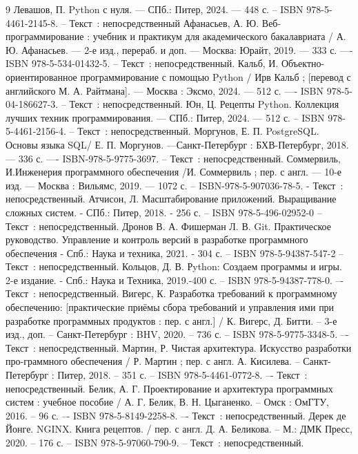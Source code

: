 \begin{thebibliography}{9}
     Левашов, П. Python с нуля. — СПб.: Питер, 2024. — 448 с. -- ISBN 978-5-4461-2145-8. -- Текст~: непосредственный
     Афанасьев, А. Ю. Веб-программирование : учебник и практикум для академического бакалавриата / А. Ю. Афанасьев. — 2-е изд., перераб. и доп. — Москва: Юрайт, 2019. — 333 с. —- ISBN 978-5-534-01432-5. -- Текст~: непосредственный.
     Кальб, И. Объектно-ориентированное программирование с помощью Python / Ирв Кальб ; [перевод с английского М. А. Райтмана]. — Москва : Эксмо, 2024. — 512 с. —- ISBN 978-5-04-186627-3. -- Текст~: непосредственный.
     Юн,	Ц. Рецепты Python. Коллекция лучших техник программирования. — СПб.: Питер, 2024. — 512 с. -- ISBN 978-5-4461-2156-4. -- Текст~: непосредственный.
     Моргунов, Е. П. PostgreSQL. Основы языка SQL/ Е. П. Моргунов. —Санкт-Петербург : БХВ-Петербург, 2018. — 336 с. —- ISBN-978-5-9775-3697. -- Текст~: непосредственный.
     Соммервиль, И.Инженерия программного обеспечения /И. Соммервиль ; пер. с англ. — 10-е изд. — Москва : Вильямс, 2019. — 1072 с. -- ISBN-978-5-907036-78-5. - Текст~: непосредственный.
     Атчисон, Л. Масштабирование приложений. Выращивание сложных систем. - СПб.: Питер, 2018. - 256 с. -- ISBN 978-5-496-02952-0 -- Текст~: непосредственный.
     Дронов В. А. Фишерман Л. В. Git. Практическое руководство. Управление и контроль версий в разработке программного обеспечения - Спб.: Наука и техника, 2021. - 304 с. -- ISBN 978-5-94387-547-2 -- Текст~: непосредственный.
     Кольцов, Д. В. Рython: Создаем программы и игры. 2-е издание. - Спб.: Наука и Техника, 2019.-400 с. -- ISBN 978-5-94387-778-0. –- Текст~: непосредственный. 
     Вигерс, К. Разработка требований к программному обеспечению: [практические приёмы сбора требований и управления ими при разработке программных продуктов : пер. с англ.] / К. Вигерс, Д. Битти. – 3-е изд., доп. – Санкт-Петербург : BHV, 2020. – 736 с. -- ISBN 978-5-9775-3348-5. –- Текст~: непосредственный.
     Мартин, Р. Чистая архитектура. Искусство разработки про-граммного обеспечения / Р. Мартин ; пер.  с англ. А. Кисилева. – Санкт-Петербург : Питер, 2018. – 351 с. – ISBN 978-5-4461-0772-8. –- Текст~: непосредственный.
     Белик, А. Г. Проектирование и архитектура программных систем : учебное пособие / А. Г. Белик, В. Н. Цыганенко. – Омск : ОмГТУ, 2016. – 96 с. –- ISBN 978-5-8149-2258-8. –- Текст~: непосредственный.
     Дерек де Йонге. NGINX. Книга рецептов. / пер. с англ. Д. А. Беликова. – М.: ДМК Пресс, 2020. – 176 с. -- ISBN 978-5-97060-790-9. -- Текст~: непосредственный.

\end{thebibliography}
